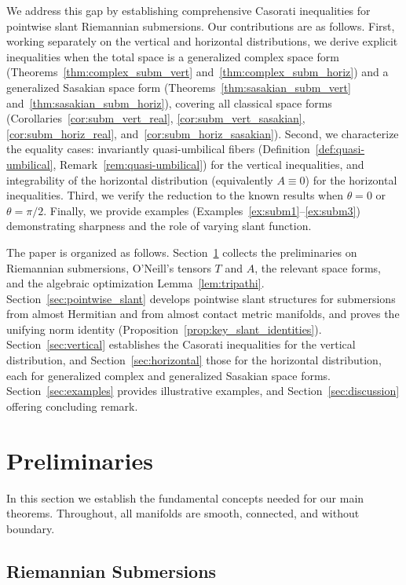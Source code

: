 \documentclass[11pt]{amsart}
\theoremstyle{plain}
\theoremstyle{definition}
\theoremstyle{remark}
\begin{document}
We address this gap by establishing comprehensive Casorati inequalities for
pointwise slant Riemannian submersions. Our contributions are as follows. First,
working separately on the vertical and horizontal distributions, we derive
explicit inequalities when the total space is a generalized complex space form
(Theorems~\ref{thm:complex_subm_vert} and~\ref{thm:complex_subm_horiz}) and a
generalized Sasakian space form (Theorems~\ref{thm:sasakian_subm_vert}
and~\ref{thm:sasakian_subm_horiz}), covering all classical space forms
(Corollaries~\ref{cor:subm_vert_real}, \ref{cor:subm_vert_sasakian},
\ref{cor:subm_horiz_real}, and~\ref{cor:subm_horiz_sasakian}). Second, we
characterize the equality cases: invariantly quasi-umbilical fibers
(Definition~\ref{def:quasi-umbilical}, Remark~\ref{rem:quasi-umbilical}) for the
vertical inequalities, and integrability of the horizontal distribution
(equivalently $A\equiv 0$) for the horizontal inequalities. Third, we verify
the reduction to the known results \cite{Lee2021, Polat2025, Zaidi2024} when
$\theta=0$ or $\theta=\pi/2$. Finally, we provide examples
(Examples~\ref{ex:subm1}--\ref{ex:subm3}) demonstrating sharpness and the role
of varying slant function.

The paper is organized as follows. Section~\ref{sec:preliminaries} collects the
preliminaries on Riemannian submersions, O'Neill's tensors $T$ and $A$, the
relevant space forms, and the algebraic optimization Lemma~\ref{lem:tripathi}.
Section~\ref{sec:pointwise_slant} develops pointwise slant structures for
submersions from almost Hermitian and from almost contact metric manifolds, and
proves the unifying norm identity (Proposition~\ref{prop:key_slant_identities}).
Section~\ref{sec:vertical} establishes the Casorati inequalities for the
vertical distribution, and Section~\ref{sec:horizontal} those for the horizontal
distribution, each for generalized complex and generalized Sasakian space forms.
Section~\ref{sec:examples} provides illustrative examples, and
Section~\ref{sec:discussion} offering concluding remark. 


\section{Preliminaries}\label{sec:preliminaries}

In this section we establish the fundamental concepts needed for our main
theorems. Throughout, all manifolds are smooth, connected, and without
boundary.

\subsection{Riemannian Submersions}
\end{document}
